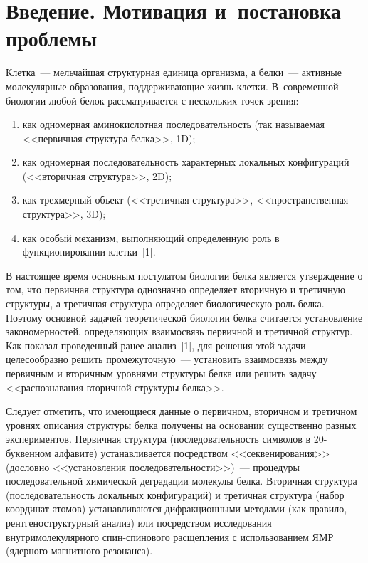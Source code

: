       \begin{multicols}{2}

      \label{st\stat}

\section{Введение. Мотивация и~постановка проблемы}

    Клетка~--- мельчайшая структурная единица организма, а белки~--- 
активные молекулярные образования, поддерживающие жизнь клетки. 
В~современной биологии любой белок рассматривается с нескольких точек 
зрения:
\begin{enumerate}[(1)]
\item как одномерная аминокислотная последовательность (так на\-зы\-ва\-емая 
<<первичная структура белка>>, 1D); 
\item как одномерная последовательность 
характерных локальных конфигураций (<<вторичная структура>>, 2D); 
\item как 
трехмерный объект (<<третичная структура>>, <<пространственная 
структура>>, 3D);
\item как особый механизм, выполняющий определенную 
роль в функционировании клет\-ки~[1]. 
\end{enumerate}

    В настоящее время основным постулатом биологии белка является 
утверждение о том, что первичная структура однозначно определяет вторичную 
и третичную структуры, а третичная структура определяет биологическую роль 
белка. Поэтому основной задачей теоретической биологии белка считается 
установление закономерностей, определяющих взаимосвязь первичной и 
третичной структур. Как показал проведенный ранее анализ~[1], для решения 
этой задачи целесообразно решить промежуточную~--- установить взаимосвязь 
между первичным и вторичным уровнями структуры белка или решить задачу 
<<распознавания вторичной структуры белка>>. 

    Следует отметить, что имеющиеся данные о первич\-ном, вторичном и 
третичном уровнях описания структуры белка получены на основании 
существенно  разных экспериментов. Первичная структура 
(последовательность символов в 20-бук\-вен\-ном алфавите) устанавливается 
посредством <<секвенирования>> (дословно <<установления 
последова\-тельности>>)~--- процедуры последовательной хи\-мической 
деградации  молекулы белка. Вторичная структура (последовательность 
локальных конфигураций) и третичная структура (набор координат атомов) 
устанавливаются дифракционными методами (как правило, 
рентгеноструктурный анализ) или посредством исследования 
внутримолекулярного спин-спи\-но\-во\-го расщепления с использованием 
ЯМР (ядерного магнитного резо\-нанса).  


\end{multicols}
